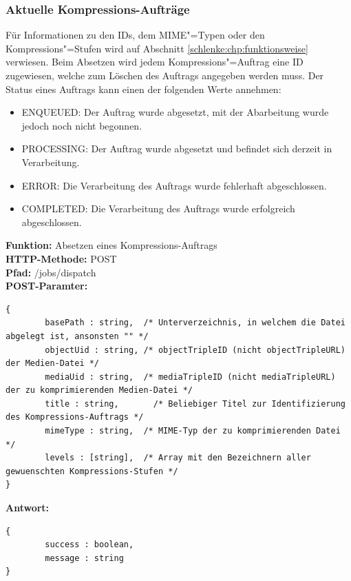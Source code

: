 \subsubsection{Aktuelle Kompressions-Aufträge}

Für Informationen zu den IDs, dem MIME"=Typen oder den Kompressions"=Stufen wird auf Abschnitt \ref{schlenke:chp:funktionsweise} verwiesen. Beim Absetzen wird jedem Kompressions"=Auftrag eine ID zugewiesen, welche zum Löschen des Auftrags angegeben werden muss. Der Status eines Auftrags kann einen der folgenden Werte annehmen:
\begin{itemize}
\item {\ttfamily ENQUEUED}: Der Auftrag wurde abgesetzt, mit der Abarbeitung wurde jedoch noch nicht begonnen.
\item {\ttfamily PROCESSING}: Der Auftrag wurde abgesetzt und befindet sich derzeit in Verarbeitung.
\item {\ttfamily ERROR}: Die Verarbeitung des Auftrags wurde fehlerhaft abgeschlossen.
\item {\ttfamily COMPLETED}: Die Verarbeitung des Auftrags wurde erfolgreich abgeschlossen.
\end{itemize}

\noindent\textbf{Funktion: }Absetzen eines Kompressions-Auftrags\\
\textbf{HTTP-Methode: } {\ttfamily POST} \\
\textbf{Pfad: } {\ttfamily /jobs/dispatch} \\
\textbf{POST-Paramter: }
\begin{lstlisting}[caption={POST-Parameter zum Absetzen eines Kompressions-Auftrags}]
{
		basePath : string, 	/* Unterverzeichnis, in welchem die Datei abgelegt ist, ansonsten "" */
		objectUid : string, /* objectTripleID (nicht objectTripleURL) der Medien-Datei */
		mediaUid : string, 	/* mediaTripleID (nicht mediaTripleURL) der zu komprimierenden Medien-Datei */
		title : string, 	  /* Beliebiger Titel zur Identifizierung des Kompressions-Auftrags */
		mimeType : string, 	/* MIME-Typ der zu komprimierenden Datei */
		levels : [string], 	/* Array mit den Bezeichnern aller gewuenschten Kompressions-Stufen */
}
\end{lstlisting}
\textbf{Antwort: }
\begin{lstlisting}[caption={Antwort auf das Absetzen eines Kompressions-Auftrags}]
{
		success : boolean,
		message : string
}
\end{lstlisting}

